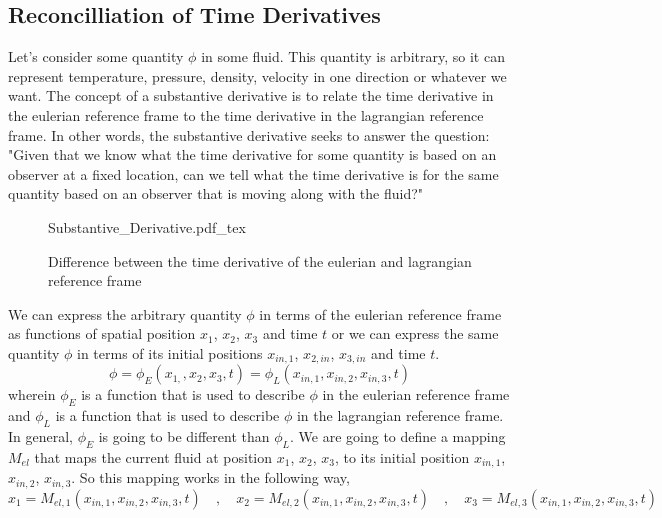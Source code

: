 \subsection{Reconcilliation of Time Derivatives}
\begin{comment}
\end{comment}
Let's consider some quantity $\phi$ in some fluid. 
This quantity is arbitrary, so it can represent temperature, pressure, density, velocity in one direction or whatever we want. 
The concept of a substantive derivative is to relate the time derivative in the eulerian reference frame to the time derivative in the lagrangian reference frame.
In other words, the substantive derivative seeks to answer the question: "Given that we know what the time derivative for some quantity is based on an observer at a fixed location, can we tell what the time derivative is for the same quantity based on an observer that is moving along with the fluid?"
\begin{figure}[H]\centering
\def\svgwidth{500px}
{Substantive_Derivative.pdf_tex}
\caption{Difference between the time derivative of the eulerian and lagrangian reference frame}
\label{eulerian-lagrangian reference frame derivative}
\end{figure}
We can express the arbitrary quantity $\phi$ in terms of the eulerian reference frame as functions of spatial position $x_{1}$, $x_{2}$, $x_{3}$ and time $t$ or we can express the same quantity $\phi$ in terms of its initial positions $x_{in,1}$, $x_{2,in}$, $x_{3,in}$ and time $t$.
\begin{equation}\phi = \phi_{E}(x_{1,},x_{2},x_{3},t) = \phi_{L}(x_{in,1},x_{in,2},x_{in,3},t) \label{Substantive Derivative Functional Representation}\end{equation}
wherein $\phi_{E}$ is a function that is used to describe $\phi$ in the eulerian reference frame and $\phi_{L}$ is a function that is used to describe $\phi$ in the lagrangian reference frame.
In general, $\phi_{E}$ is going to be different than $\phi_{L}$.
We are going to define a mapping $M_{el}$ that maps the current fluid at position $x_{1}$, $x_{2}$, $x_{3}$, to its initial position $x_{in,1}$, $x_{in,2}$, $x_{in,3}$.
So this mapping works in the following way,
\begin{equation}x_{1} = M_{el,1}(x_{in,1}, x_{in,2}, x_{in,3}, t) \quad,\quad x_{2} = M_{el,2}(x_{in,1}, x_{in,2}, x_{in,3}, t) \quad,\quad x_{3} = M_{el,3}(x_{in,1}, x_{in,2}, x_{in,3}, t) \label{Definition of Lagrangian to Euler Reference Frame Mapping}\end{equation}
